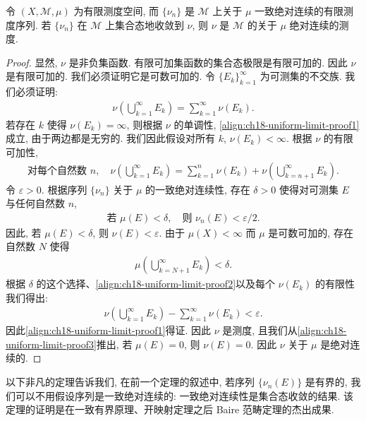 \documentclass[../../main.tex]{subfiles}
\begin{document}
\begin{theorem}\label{theorem:ch18-uniform-limit-measure}
令 $(X,\mathcal{M},\mu)$ 为有限测度空间, 而 $\{\nu_{n}\}$ 是 $\mathcal{M}$ 上关于 $\mu$ 一致绝对连续的有限测度序列. 若 $\{\nu_{n}\}$ 在 $\mathcal{M}$ 上集合态地收敛到 $\nu$, 则 $\nu$ 是 $\mathcal{M}$ 的关于 $\mu$ 绝对连续的测度.
\end{theorem}

\begin{proof}
显然, $\nu$ 是非负集函数. 有限可加集函数的集合态极限是有限可加的. 因此 $\nu$ 是有限可加的. 我们必须证明它是可数可加的. 令 $\{E_{k}\}_{k=1}^{\infty}$ 为可测集的不交族. 我们必须证明:
\begin{align}
\nu\left(\bigcup_{k=1}^{\infty}E_{k}\right)=\sum_{k=1}^{\infty}\nu(E_{k}).\label{align:ch18-uniform-limit-proof1}
\end{align}
若存在 $k$ 使得 $\nu(E_{k})=\infty$, 则根据 $\nu$ 的单调性, \eqref{align:ch18-uniform-limit-proof1}成立, 由于两边都是无穷的. 我们因此假设对所有 $k$, $\nu(E_{k})<\infty$. 根据 $\nu$ 的有限可加性,
\begin{align}
\text{对每个自然数 }n,\quad\nu\left(\bigcup_{k=1}^{\infty}E_{k}\right)=\sum_{k=1}^{n}\nu(E_{k})+\nu\left(\bigcup_{k=n+1}^{\infty}E_{k}\right).\label{align:ch18-uniform-limit-proof2}
\end{align}
令 $\varepsilon>0$. 根据序列 $\{\nu_{n}\}$ 关于 $\mu$ 的一致绝对连续性, 存在 $\delta>0$ 使得对可测集 $E$ 与任何自然数 $n$,
\begin{align}
\text{若 }\mu(E)<\delta,\quad\text{则 }\nu_{n}(E)<\varepsilon/2.\label{align:ch18-uniform-limit-proof3}
\end{align}
因此, 若 $\mu(E)<\delta$, 则 $\nu(E)<\varepsilon$. 由于 $\mu(X)<\infty$ 而 $\mu$ 是可数可加的, 存在自然数 $N$ 使得
\begin{align*}
\mu\left(\bigcup_{k=N+1}^{\infty}E_{k}\right)<\delta.
\end{align*}
根据 $\delta$ 的这个选择、\eqref{align:ch18-uniform-limit-proof2}以及每个 $\nu(E_{k})$ 的有限性我们得出:
\begin{align*}
\nu\left(\bigcup_{k=1}^{\infty}E_{k}\right)-\sum_{k=1}^{\infty}\nu(E_{k})<\varepsilon.
\end{align*}
因此\eqref{align:ch18-uniform-limit-proof1}得证. 因此 $\nu$ 是测度, 且我们从\eqref{align:ch18-uniform-limit-proof3}推出, 若 $\mu(E)=0$, 则 $\nu(E)=0$. 因此 $\nu$ 关于 $\mu$ 是绝对连续的.
\end{proof}

以下非凡的定理告诉我们, 在前一个定理的叙述中, 若序列 $\{\nu_{n}(E)\}$ 是有界的, 我们可以不用假设序列是一致绝对连续的: 一致绝对连续性是集合态收敛的结果. 该定理的证明是在一致有界原理、开映射定理之后 Baire 范畴定理的杰出成果.
\end{document}
